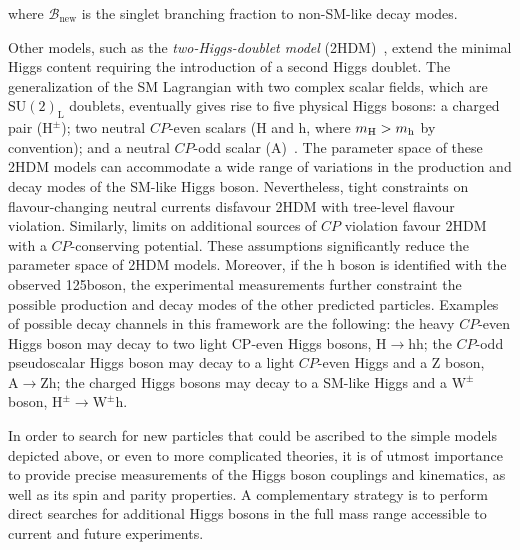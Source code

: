 \noindent where $\mathcal{B}_\mathrm{new}$ is the singlet branching fraction to non-SM-like decay modes.

Other models, such as the \emph{two-Higgs-doublet model} (2HDM)~\cite{Branco:2011iw}, extend the minimal Higgs content requiring the introduction of a second Higgs doublet. 
The generalization of the SM Lagrangian with two complex scalar fields, which are $\mathrm{SU(2)_L}$ doublets, eventually gives rise to five physical Higgs bosons: a charged pair ($\mathrm{H^{\pm}}$); two neutral $CP$-even scalars (H and h, where $m_{\rm H}>m_{\rm h}$ by convention); and a neutral $CP$-odd scalar (A)~\cite{Craig:2013hca}. The parameter space of these 2HDM models can accommodate a wide range of variations in the production and decay modes of the SM-like Higgs boson. Nevertheless, tight constraints on flavour-changing neutral currents disfavour 2HDM with tree-level flavour violation. Similarly, limits on additional sources of $CP$ violation favour 2HDM with a $CP$-conserving potential. These assumptions significantly reduce the parameter space of 2HDM models. Moreover, if the h boson is identified with the observed 125\GeV boson, the experimental measurements further constraint the possible production and decay modes of the other predicted particles. Examples of possible decay channels in this framework are the following: the  heavy  $CP$-even  Higgs boson  may  decay  to  two  light  CP-even  Higgs bosons, $\mathrm{H \to hh}$; the $CP$-odd pseudoscalar Higgs boson may decay to a light $CP$-even Higgs and a Z boson, $\mathrm{A \to Zh}$; the charged Higgs bosons may decay to a SM-like Higgs and a $\mathrm{W}^\pm$ boson, $\mathrm{H^\pm \to \mathrm{W}^\pm h}$.

In order to search for new particles that could be ascribed to the simple models depicted above, or even to more complicated theories, it is of utmost importance to provide precise measurements of the Higgs boson couplings and kinematics, as well as its spin and parity properties. A complementary strategy is to perform direct searches for additional Higgs bosons in the full mass range accessible to current and future experiments.
